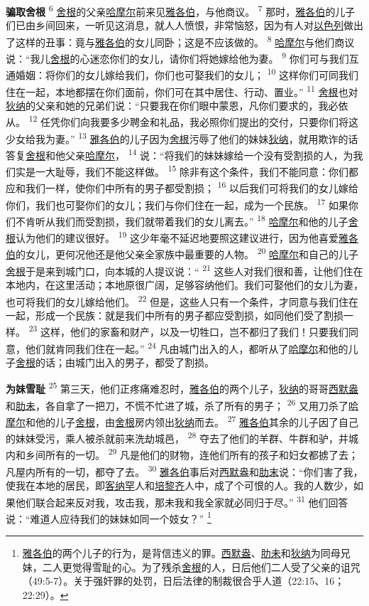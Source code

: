 \textbf{骗取舍根\quad}
\textsuperscript{6}
\uline{舍根}的父亲\uline{哈摩尔}前来见\uline{雅各伯}，与他商议。
\textsuperscript{7}
那时，\uline{雅各伯}的儿子们已由乡间回来，一听见这消息，就人人愤恨，非常恼怒，因为有人对\uline{以色列}做出了这样的丑事：竟与\uline{雅各伯}的女儿同卧；这是不应该做的。
\textsuperscript{8}
\uline{哈摩尔}与他们商议说：“我儿\uline{舍根}的心迷恋你们的女儿，请你们将她嫁给他为妻。
\textsuperscript{9}
你们可与我们互通婚姻：将你们的女儿嫁给我们，你们也可娶我们的女儿；
\textsuperscript{10}
这样你们可同我们住在一起，本地都摆在你们面前，你们可在其中居住、行动、置业。”
\textsuperscript{11}
\uline{舍根}也对\uline{狄纳}的父亲和她的兄弟们说：“只要我在你们眼中蒙恩，凡你们要求的，我必依从。
\textsuperscript{12}
任凭你们向我要多少聘金和礼品，我必照你们提出的交付，只要你们将这少女给我为妻。”
\textsuperscript{13}
\uline{雅各伯}的儿子因为\uline{舍根}污辱了他们的妹妹\uline{狄纳}，就用欺诈的话答复\uline{舍根}和他父亲\uline{哈摩尔}，
\textsuperscript{14}
说：“将我们的妹妹嫁给一个没有受割损的人，为我们实是一大耻辱，我们不能这样做。
\textsuperscript{15}
除非有这个条件，我们不能同意：你们都应和我们一样，使你们中所有的男子都受割损；
\textsuperscript{16}
以后我们可将我们的女儿嫁给你们，我们也可娶你们的女儿；我们与你们住在一起，成为一个民族。
\textsuperscript{17}
如果你们不肯听从我们而受割损，我们就带着我们的女儿离去。”
\textsuperscript{18}
\uline{哈摩尔}和他的儿子\uline{舍根}认为他们的建议很好。
\textsuperscript{19}
这少年毫不延迟地要照这建议进行，因为他喜爱\uline{雅各伯}的女儿，更何况他还是他父亲全家族中最重要的人物。
\textsuperscript{20}
\uline{哈摩尔}和自己的儿子\uline{舍根}于是来到城门口，向本城的人提议说：“
\textsuperscript{21}
这些人对我们很和善，让他们住在本地内，在这里活动；本地原很广阔，足够容纳他们。我们可娶他们的女儿为妻，也可将我们的女儿嫁给他们。
\textsuperscript{22}
但是，这些人只有一个条件，才同意与我们住在一起，形成一个民族：就是我们中所有的男子都应受割损，如同他们受了割损一样。
\textsuperscript{23}
这样，他们的家畜和财产，以及一切牲口，岂不都归了我们！只要我们同意，他们就肯同我们住在一起。”
\textsuperscript{24}
凡由城门出入的人，都听从了\uline{哈摩尔}和他的儿子\uline{舍根}的话；由城门出入的男子，都受了割损。

\textbf{为妹雪耻\quad}
\textsuperscript{25}
第三天，他们正疼痛难忍时，\uline{雅各伯}的两个儿子，\uline{狄纳}的哥哥\uline{西默盎}和\uline{肋未}，各自拿了一把刀，不慌不忙进了城，杀了所有的男子；
\textsuperscript{26}
又用刀杀了\uline{哈摩尔}和他的儿子\uline{舍根}，由\uline{舍根}房内领出\uline{狄纳}而去。
\textsuperscript{27}
\uline{雅各伯}其余的儿子因了自己的妹妹受污，乘人被杀就前来洗劫城邑，
\textsuperscript{28}
夺去了他们的羊群、牛群和驴，并城内和乡间所有的一切。
\textsuperscript{29}
凡是他们的财物，连他们所有的孩子和妇女都掳了去；凡屋内所有的一切，都夺了去。
\textsuperscript{30}
\uline{雅各伯}事后对\uline{西默盎}和\uline{肋末}说：“你们害了我，使我在本地的居民，即\uline{客纳罕}人和\uline{培黎齐}人中，成了个可恨的人。我的人数少，如果他们联合起来反对我，攻击我，那未我和我全家就必同归于尽。”
\textsuperscript{31}
他们回答说：“难道人应待我们的妹妹如同一个妓女？”
\footnote{\uline{雅各伯}的两个儿子的行为，是背信违义的罪。\uline{西默盎}、\uline{肋未}和\uline{狄纳}为同母兄妹，二人更觉得雪耻的心。为了残杀\uline{舍根}的人，日后他们二人受了父亲的诅咒（49:5-7）。关于强奸罪的处罚，日后法律的制裁很合乎人道（22:15、16；22:29）。}

